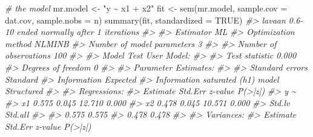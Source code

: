 \documentclass[
  11pt,
]{krantz}
\makeatletter
\newenvironment{Shaded}{\begin{snugshade}}{\end{snugshade}}
\newcommand{\AttributeTok}[1]{\textcolor[rgb]{0.61,0.61,0.61}{#1}}
\newcommand{\CommentTok}[1]{\textcolor[rgb]{0.37,0.37,0.37}{\textit{#1}}}
\newcommand{\ConstantTok}[1]{\textcolor[rgb]{0,0,0}{#1}}
\newcommand{\FunctionTok}[1]{\textcolor[rgb]{0,0,0}{#1}}
\newcommand{\NormalTok}[1]{#1}
\newcommand{\OtherTok}[1]{\textcolor[rgb]{0.37,0.37,0.37}{#1}}
\newcommand{\StringTok}[1]{\textcolor[rgb]{0.5,0.5,0.5}{#1}}
\newenvironment{kframe}{%
\medskip{}
\setlength{\fboxsep}{.8em}
 \def\at@end@of@kframe{}%
 \ifinner\ifhmode%
  \def\at@end@of@kframe{\end{minipage}}%
  \begin{minipage}{\columnwidth}%
 \fi\fi%
 \def\FrameCommand##1{\hskip\@totalleftmargin \hskip-\fboxsep
 \colorbox{shadecolor}{##1}\hskip-\fboxsep
     \hskip-\linewidth \hskip-\@totalleftmargin \hskip\columnwidth}%
 \MakeFramed {\advance\hsize-\width
   \@totalleftmargin\z@ \linewidth\hsize
   \@setminipage}}%
 {\par\unskip\endMakeFramed%
 \at@end@of@kframe}
\renewenvironment{Shaded}{\begin{kframe}}{\end{kframe}}
\theoremstyle{definition}
\theoremstyle{definition}
\theoremstyle{definition}
\theoremstyle{definition}
\theoremstyle{remark}
\makeatother
\begin{document}
\begin{Shaded}
\begin{Highlighting}[]
\CommentTok{\# the model}
\NormalTok{mr.model }\OtherTok{\textless{}{-}} \StringTok{"y \textasciitilde{} x1 + x2"}
\NormalTok{fit }\OtherTok{\textless{}{-}} \FunctionTok{sem}\NormalTok{(mr.model, }\AttributeTok{sample.cov =}\NormalTok{ dat.cov, }\AttributeTok{sample.nobs =}\NormalTok{ n)}
\FunctionTok{summary}\NormalTok{(fit, }\AttributeTok{standardized =} \ConstantTok{TRUE}\NormalTok{)}
\CommentTok{\#\textgreater{} lavaan 0.6{-}10 ended normally after 1 iterations}
\CommentTok{\#\textgreater{} }
\CommentTok{\#\textgreater{}   Estimator                                         ML}
\CommentTok{\#\textgreater{}   Optimization method                           NLMINB}
\CommentTok{\#\textgreater{}   Number of model parameters                         3}
\CommentTok{\#\textgreater{}                                                       }
\CommentTok{\#\textgreater{}   Number of observations                           100}
\CommentTok{\#\textgreater{}                                                       }
\CommentTok{\#\textgreater{} Model Test User Model:}
\CommentTok{\#\textgreater{}                                                       }
\CommentTok{\#\textgreater{}   Test statistic                                 0.000}
\CommentTok{\#\textgreater{}   Degrees of freedom                                 0}
\CommentTok{\#\textgreater{} }
\CommentTok{\#\textgreater{} Parameter Estimates:}
\CommentTok{\#\textgreater{} }
\CommentTok{\#\textgreater{}   Standard errors                             Standard}
\CommentTok{\#\textgreater{}   Information                                 Expected}
\CommentTok{\#\textgreater{}   Information saturated (h1) model          Structured}
\CommentTok{\#\textgreater{} }
\CommentTok{\#\textgreater{} Regressions:}
\CommentTok{\#\textgreater{}                    Estimate  Std.Err  z{-}value  P(\textgreater{}|z|)}
\CommentTok{\#\textgreater{}   y \textasciitilde{}                                                 }
\CommentTok{\#\textgreater{}     x1                0.575    0.045   12.710    0.000}
\CommentTok{\#\textgreater{}     x2                0.478    0.045   10.571    0.000}
\CommentTok{\#\textgreater{}    Std.lv  Std.all}
\CommentTok{\#\textgreater{}                   }
\CommentTok{\#\textgreater{}     0.575    0.575}
\CommentTok{\#\textgreater{}     0.478    0.478}
\CommentTok{\#\textgreater{} }
\CommentTok{\#\textgreater{} Variances:}
\CommentTok{\#\textgreater{}                    Estimate  Std.Err  z{-}value  P(\textgreater{}|z|)}

\end{Highlighting}
\end{Shaded}
\end{document}
